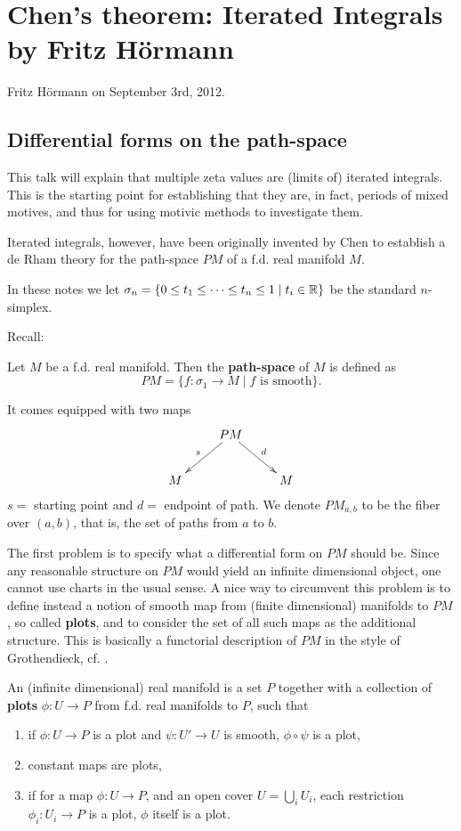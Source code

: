 \chapter{Chen's theorem: Iterated Integrals by Fritz H\"ormann}

Fritz H\"ormann on September 3rd, 2012.

\section{Differential forms on the path-space}

This talk will explain that multiple zeta values are (limits of) iterated integrals. This is the starting point for establishing that they are, in fact, periods of mixed motives, and thus for using motivic methods to investigate them. 

Iterated integrals, however, have been originally invented by Chen \cite{chen-1973} to establish a de Rham theory for the path-space $PM$ of a f.d. real manifold $M$. 

In these notes we let $\sigma_n = \{ 0 \leq t_1 \leq \cdots \leq t_n \leq 1 \mid t_i \in \mathbb{R}\}$ be the standard $n$-simplex.

Recall:

\begin{defn}
Let $M$ be a f.d. real manifold. Then the {\bf path-space} of $M$ is defined as 
\[ PM = \{ f : \sigma_1 \to M \mid f \textrm{~is smooth} \}. \]
\end{defn}

\noindent It comes equipped with two maps
\[
\xymatrix{
& PM \ar[dl]_s \ar[dr]^d & \\
M & & M
}
\]
$s=$ starting point and $d=$ endpoint of path. We denote $PM_{a,b}$ to be the 
fiber over $(a,b)$, that is, the set of paths from $a$ to $b$.

The first problem is to specify what a differential form on $PM$ should be. Since any reasonable structure on $PM$ would yield an infinite dimensional object, one cannot use charts in the usual sense. A nice way to circumvent this problem is to define instead a notion of smooth map from (finite dimensional) manifolds to $PM$, so called {\bf plots}, and to consider the set of all such maps as the additional structure. This is basically a functorial description of $PM$ in the style of Grothendieck, cf. \cite[Chapter 8]{peters-2008}.

\begin{defn}
An (infinite dimensional) real manifold is a set $P$ together with a 
collection of {\bf plots} $\phi :  U \to P$ from f.d. real manifolds to $P$, such that
\begin{enumerate}
\item if $\phi: U \to P$ is a plot and $\psi: U' \to U$ is smooth, $\phi \circ \psi$ is a plot, 
\item constant maps are plots,
\item if for a map $\phi: U \to P$, and an open cover $U = \bigcup_i U_i$, each restriction
$\phi_i: U_i \to P$ is a plot, $\phi$ itself is a plot.
\end{enumerate}
\end{defn}

